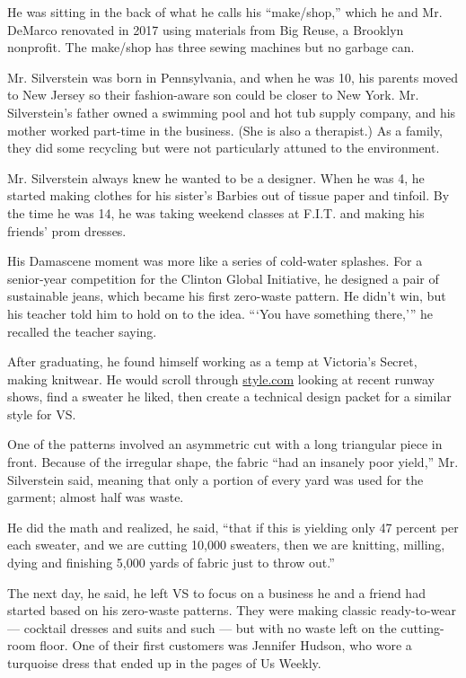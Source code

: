 He was sitting in the back of what he calls his ``make/shop,'' which he
and Mr. DeMarco renovated in 2017 using materials from Big Reuse, a
Brooklyn nonprofit. The make/shop has three sewing machines but no
garbage can.

Mr. Silverstein was born in Pennsylvania, and when he was 10, his
parents moved to New Jersey so their fashion-aware son could be closer
to New York. Mr. Silverstein's father owned a swimming pool and hot tub
supply company, and his mother worked part-time in the business. (She is
also a therapist.) As a family, they did some recycling but were not
particularly attuned to the environment.

Mr. Silverstein always knew he wanted to be a designer. When he was 4,
he started making clothes for his sister's Barbies out of tissue paper
and tinfoil. By the time he was 14, he was taking weekend classes at
F.I.T. and making his friends' prom dresses.

His Damascene moment was more like a series of cold-water splashes. For
a senior-year competition for the Clinton Global Initiative, he designed
a pair of sustainable jeans, which became his first zero-waste pattern.
He didn't win, but his teacher told him to hold on to the idea. ```You
have something there,''' he recalled the teacher saying.

After graduating, he found himself working as a temp at Victoria's
Secret, making knitwear. He would scroll through
\href{http://style.com/}{style.com} looking at recent runway shows, find
a sweater he liked, then create a technical design packet for a similar
style for VS.

One of the patterns involved an asymmetric cut with a long triangular
piece in front. Because of the irregular shape, the fabric ``had an
insanely poor yield,'' Mr. Silverstein said, meaning that only a portion
of every yard was used for the garment; almost half was waste.

He did the math and realized, he said, ``that if this is yielding only
47 percent per each sweater, and we are cutting 10,000 sweaters, then we
are knitting, milling, dying and finishing 5,000 yards of fabric just to
throw out.''

The next day, he said, he left VS to focus on a business he and a friend
had started based on his zero-waste patterns. They were making classic
ready-to-wear --- cocktail dresses and suits and such --- but with no
waste left on the cutting-room floor. One of their first customers was
Jennifer Hudson, who wore a turquoise dress that ended up in the pages
of Us Weekly.

